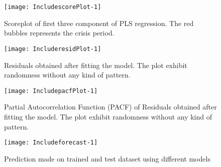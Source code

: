 \documentclass[12pt, lot, lof]{thesis}\usepackage[]{graphicx}\usepackage[]{color}
\makeatletter
\def\maxwidth{ %
  \ifdim\Gin@nat@width>\linewidth
    \linewidth
  \else
    \Gin@nat@width
  \fi
}
\makeatother
\begin{document}
\begin{Schunk}
\begin{figure}[!h]

{\centering \texttt{[image: IncludescorePlot-1]} 

}

\caption[Scoreplot of first three component of PLS regression]{Scoreplot of first three component of PLS regression. The red bubbles represents the crisis period.\label{fig:scorePlot}}
\end{figure}
\end{Schunk}

\begin{Schunk}
\begin{figure}

{\centering \texttt{[image: IncluderesidPlot-1]} 

}

\caption[Residuals obtained after fitting the model]{Residuals obtained after fitting the model. The plot exhibit randomness without any kind of pattern.\label{fig:residPlot}}
\end{figure}
\end{Schunk}

\begin{Schunk}
\begin{figure}

{\centering \texttt{[image: IncludepacfPlot-1]} 

}

\caption[Partial Autocorrelation Function (PACF) of Residuals obtained after fitting the model]{Partial Autocorrelation Function (PACF) of Residuals obtained after fitting the model. The plot exhibit randomness without any kind of pattern.\label{fig:pacfPlot}}
\end{figure}
\end{Schunk}

\begin{Schunk}
\begin{figure}

{\centering \texttt{[image: Includeforecast-1]} 

}

\caption[Prediction made on trained and test dataset using different models]{Prediction made on trained and test dataset using different models\label{fig:forecast}}
\end{figure}
\end{Schunk}
  

\end{document}
